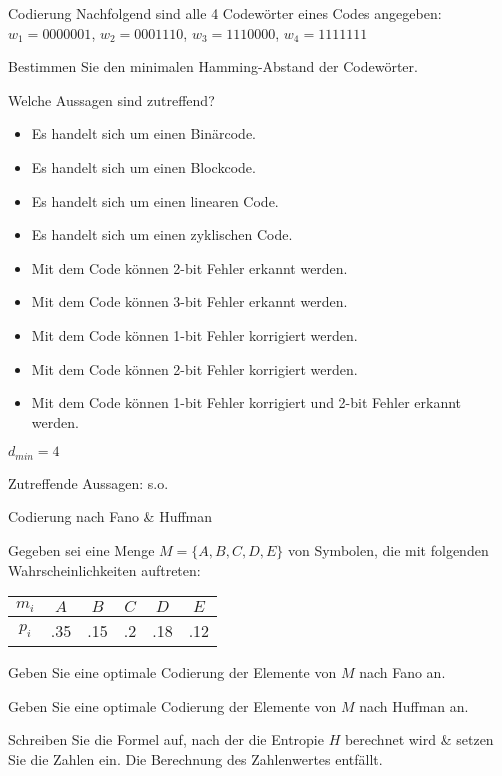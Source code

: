 \documentclass{exercisesheet}
\begin{document}
\begin{eexercises}{Codierung}{
    Nachfolgend sind alle 4 Codewörter eines Codes angegeben:
    \centering $w_1 = 0000001$, $w_2 = 0001110$, $w_3 = 1110000$, $w_4 = 1111111$
  }
  \item Bestimmen Sie den minimalen Hamming-Abstand der Codewörter.
  \item Welche Aussagen sind zutreffend?
  \begin{itemize}
    \item Es handelt sich um einen Binärcode. \psolution{\checkmark}
    \item Es handelt sich um einen Blockcode. \psolution{\checkmark}
    \item Es handelt sich um einen linearen Code. \psolution{\xmark}
    \item Es handelt sich um einen zyklischen Code. \psolution{\checkmark}
    \item Mit dem Code können 2-bit Fehler erkannt werden. \psolution{\checkmark}
    \item Mit dem Code können 3-bit Fehler erkannt werden. \psolution{\checkmark}
    \item Mit dem Code können 1-bit Fehler korrigiert werden. \psolution{\checkmark}
    \item Mit dem Code können 2-bit Fehler korrigiert werden. \psolution{\xmark}
    \item Mit dem Code können 1-bit Fehler korrigiert und 2-bit Fehler erkannt werden. \psolution{\checkmark}
  \end{itemize}
\end{eexercises}

\begin{solutions}
  \item $d_{min} = 4$
  \item Zutreffende Aussagen: s.o.
\end{solutions}

\begin{eexercises}{Codierung nach Fano \& Huffman}{
    Gegeben sei eine Menge $M = \{A, B, C, D, E\}$ von Symbolen, die mit folgenden Wahrscheinlichkeiten auftreten:
    \begin{tabular}{c|ccccc}
      $m_i$ & $A$ & $B$ & $C$ & $D$ & $E$ \\
      \hline
      $p_i$ & .35 & .15 & .2  & .18 & .12 \\
    \end{tabular}
  }
  \item Geben Sie eine optimale Codierung der Elemente von $M$ nach Fano an.
  \item Geben Sie eine optimale Codierung der Elemente von $M$ nach Huffman an.
  \item Schreiben Sie die Formel auf, nach der die Entropie $H$ berechnet wird \& setzen Sie die Zahlen ein. Die Berechnung des Zahlenwertes entfällt.
\end{eexercises}
\end{document}
